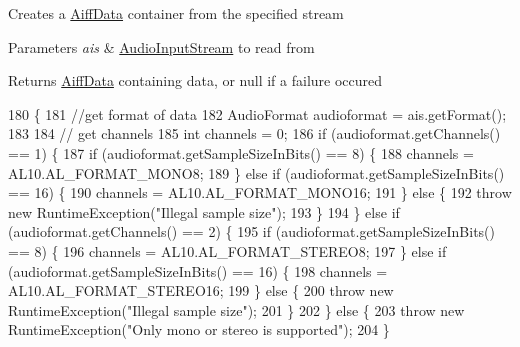 Creates a \mbox{\hyperlink{classorg_1_1newdawn_1_1slick_1_1openal_1_1_aiff_data}{Aiff\+Data}} container from the specified stream


\begin{DoxyParams}{Parameters}
{\em ais} & \mbox{\hyperlink{interfaceorg_1_1newdawn_1_1slick_1_1openal_1_1_audio_input_stream}{Audio\+Input\+Stream}} to read from \\
\hline
\end{DoxyParams}
\begin{DoxyReturn}{Returns}
\mbox{\hyperlink{classorg_1_1newdawn_1_1slick_1_1openal_1_1_aiff_data}{Aiff\+Data}} containing data, or null if a failure occured 
\end{DoxyReturn}

\begin{DoxyCode}
180                                                         \{
181         \textcolor{comment}{//get format of data}
182         AudioFormat audioformat = ais.getFormat();
183         
184         \textcolor{comment}{// get channels}
185         \textcolor{keywordtype}{int} channels = 0;
186         \textcolor{keywordflow}{if} (audioformat.getChannels() == 1) \{
187             \textcolor{keywordflow}{if} (audioformat.getSampleSizeInBits() == 8) \{
188                 channels = AL10.AL\_FORMAT\_MONO8;
189             \} \textcolor{keywordflow}{else} \textcolor{keywordflow}{if} (audioformat.getSampleSizeInBits() == 16) \{
190                 channels = AL10.AL\_FORMAT\_MONO16;
191             \} \textcolor{keywordflow}{else} \{
192                 \textcolor{keywordflow}{throw} \textcolor{keyword}{new} RuntimeException(\textcolor{stringliteral}{"Illegal sample size"});
193             \}
194         \} \textcolor{keywordflow}{else} \textcolor{keywordflow}{if} (audioformat.getChannels() == 2) \{
195             \textcolor{keywordflow}{if} (audioformat.getSampleSizeInBits() == 8) \{
196                 channels = AL10.AL\_FORMAT\_STEREO8;
197             \} \textcolor{keywordflow}{else} \textcolor{keywordflow}{if} (audioformat.getSampleSizeInBits() == 16) \{
198                 channels = AL10.AL\_FORMAT\_STEREO16;
199             \} \textcolor{keywordflow}{else} \{
200                 \textcolor{keywordflow}{throw} \textcolor{keyword}{new} RuntimeException(\textcolor{stringliteral}{"Illegal sample size"});
201             \}
202         \} \textcolor{keywordflow}{else} \{
203             \textcolor{keywordflow}{throw} \textcolor{keyword}{new} RuntimeException(\textcolor{stringliteral}{"Only mono or stereo is supported"});
204         \}

\end{DoxyCode}
